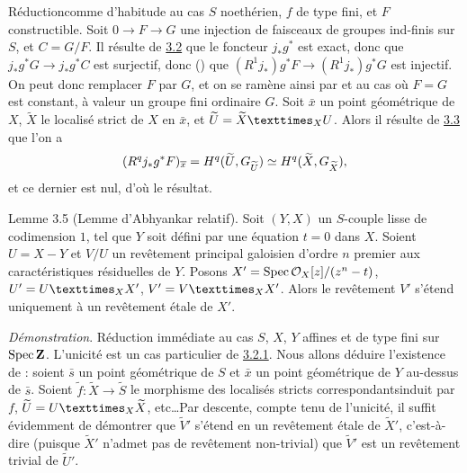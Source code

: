 \documentclass[10pt]{../fichiers-configuration-latex/smfart}
\begin{document}
Réduction\pageoriginale comme d'habitude au cas $S$ noethérien, $f$ de
type fini, et $F$ constructible. Soit $0\rightarrow F\rightarrow G$
une injection de faisceaux de groupes ind-finis sur $S$, et $C=G/F$. Il
résulte de \hyperref[XVI.prop3.2]{3.2} que le foncteur $j_{\ast}g^{\ast}$ est
exact, donc que 
$j_{\ast}g^{\ast}G\rightarrow j_{\ast}g^{\ast}C$ est surjectif, donc
() que $(R^{1}j_{\ast})g^{\ast}F\rightarrow
(R^{1}j_{\ast})g^{\ast}G$ est injectif. On peut donc remplacer $F$ par
$G$, et on se ramène ainsi par  et 
au cas où $F=G$ est constant, à valeur un groupe fini ordinaire $G$.
Soit $\bar{x}$ un
point géométrique de $X$, $\widetilde{X}$ le localisé strict de $X$ en
$\bar{x}$, et $\widetilde{U}=\fprod{\widetilde{X}}{U}{X}$. Alors il
résulte de \hyperref[XVI.thm3.3]{3.3} que l'on a
$$
(R^{q}j_{\ast}g^{\ast}F)_{\overline{x}}=H^{q}(\widetilde{U},G_{\widetilde{U}})\simeq
H^{q}(\widetilde{X},G_{\widetilde{X}}){},
$$
et ce dernier est nul, d'où le résultat.

\begin{enonce*}{Lemme 3.5}
(Lemme d'Abhyankar relatif). Soit $(Y,X)$ un $S$-couple lisse de
  codimension $1$, tel que $Y$ soit défini par une équation $t=0$ dans
  $X$. Soient $U=X-Y$ et $V/U$ un revêtement principal galoisien
  d'ordre $n$ premier aux caractéristiques résiduelles de $Y$. Posons
  $X'=\operatorname{Spec} {\mathcal O}_X[z]/(z^n-t)$, $U'=\fprod{U}{X'}{X}$,
  $V'=\fprod{V}{X'}{X}$. Alors le revêtement $V'$ s'étend uniquement à
  un revêtement étale de $X'$.
\end{enonce*}

\noindent
\emph{Démonstration}. Réduction immédiate au cas $S$, $X$, $Y$ affines
et de type fini sur $\operatorname{Spec} \mathbf{Z}$. L'unicité est un cas
particulier de \hyperref[XVI.cor3.2.1]{3.2.1}. Nous allons déduire l'existence de :
soient $\bar{s}$ un point géométrique de $S$ et $\bar{x}$ un point
géométrique de $Y$ au-dessus de $\bar{s}$. Soient
$\widetilde{f}:\widetilde{X}\rightarrow \widetilde{S}$ le morphisme
des localisés stricts correspondants\pageoriginale induit par $f$,
$\widetilde{U}=\fprod{U}{\widetilde{X}}{X}$, etc\ldots Par descente,
compte tenu de l'unicité, il suffit évidemment de démontrer que
$\widetilde{V}'$ s'étend en un revêtement étale de $\widetilde{X}'$,
c'est-à-dire (puisque $\widetilde{X}'$ n'admet pas de revêtement
non-trivial) que $\widetilde{V}'$ est un revêtement trivial de
$\widetilde{U}'$.
\end{document}
